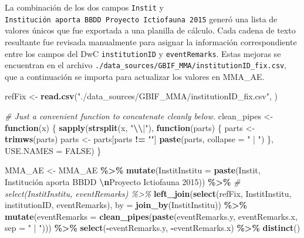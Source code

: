 \documentclass[sn-apa,pdflatex]{sn-jnl}
\newenvironment{Shaded}{\begin{snugshade}}{\end{snugshade}}
\newcommand{\AttributeTok}[1]{\textcolor[rgb]{0.13,0.29,0.53}{#1}}
\newcommand{\CommentTok}[1]{\textcolor[rgb]{0.56,0.35,0.01}{\textit{#1}}}
\newcommand{\ConstantTok}[1]{\textcolor[rgb]{0.56,0.35,0.01}{#1}}
\newcommand{\ControlFlowTok}[1]{\textcolor[rgb]{0.13,0.29,0.53}{\textbf{#1}}}
\newcommand{\FunctionTok}[1]{\textcolor[rgb]{0.13,0.29,0.53}{\textbf{#1}}}
\newcommand{\NormalTok}[1]{#1}
\newcommand{\OtherTok}[1]{\textcolor[rgb]{0.56,0.35,0.01}{#1}}
\newcommand{\SpecialCharTok}[1]{\textcolor[rgb]{0.81,0.36,0.00}{\textbf{#1}}}
\newcommand{\StringTok}[1]{\textcolor[rgb]{0.31,0.60,0.02}{#1}}
\begin{document}
La combinación de los dos campos \texttt{Instit} y
\texttt{Institución\ aporta\ BBDD\ Proyecto\ Ictiofauna\ 2015} generó
una lista de valores únicos que fue exportada a una planilla de cálculo.
Cada cadena de texto resultante fue revisada manualmente para asignar la
información correspondiente entre los campos del DwC
\texttt{institutionID} y \texttt{eventRemarks}. Estas mejoras se
encuentran en el archivo
\texttt{./data\_sources/GBIF\_MMA/institutionID\_fix.csv}, que a
continuación se importa para actualizar los valores en MMA\_AE.

\begin{Shaded}
\begin{Highlighting}[]
\NormalTok{refFix }\OtherTok{\textless{}{-}} \FunctionTok{read.csv}\NormalTok{(}\StringTok{"./data\_sources/GBIF\_MMA/institutionID\_fix.csv"}\NormalTok{,}
\NormalTok{    )}

\CommentTok{\# Just a convenient function to concatenate cleanly below.}
\NormalTok{clean\_pipes }\OtherTok{\textless{}{-}} \ControlFlowTok{function}\NormalTok{(x) \{}
    \FunctionTok{sapply}\NormalTok{(}\FunctionTok{strsplit}\NormalTok{(x, }\StringTok{"}\SpecialCharTok{\textbackslash{}\textbackslash{}}\StringTok{|"}\NormalTok{), }\ControlFlowTok{function}\NormalTok{(parts) \{}
\NormalTok{        parts }\OtherTok{\textless{}{-}} \FunctionTok{trimws}\NormalTok{(parts)}
\NormalTok{        parts }\OtherTok{\textless{}{-}}\NormalTok{ parts[parts }\SpecialCharTok{!=} \StringTok{""}\NormalTok{]}
        \FunctionTok{paste}\NormalTok{(parts, }\AttributeTok{collapse =} \StringTok{" | "}\NormalTok{)}
\NormalTok{    \}, }\AttributeTok{USE.NAMES =} \ConstantTok{FALSE}\NormalTok{)}
\NormalTok{\}}

\NormalTok{MMA\_AE }\OtherTok{\textless{}{-}}\NormalTok{ MMA\_AE }\SpecialCharTok{\%\textgreater{}\%}
    \FunctionTok{mutate}\NormalTok{(}\AttributeTok{InstitInstitu =} \FunctionTok{paste}\NormalTok{(Instit, }\StringTok{\textasciigrave{}}\AttributeTok{Institución aporta BBDD }\SpecialCharTok{\textbackslash{}n}\AttributeTok{Proyecto Ictiofauna 2015}\StringTok{\textasciigrave{}}\NormalTok{)) }\SpecialCharTok{\%\textgreater{}\%}
    \CommentTok{\# select(InstitInstitu, eventRemarks) \%\textgreater{}\%}
\FunctionTok{left\_join}\NormalTok{(}\FunctionTok{select}\NormalTok{(refFix, InstitInstitu, institutionID, eventRemarks),}
    \AttributeTok{by =} \FunctionTok{join\_by}\NormalTok{(InstitInstitu)) }\SpecialCharTok{\%\textgreater{}\%}
    \FunctionTok{mutate}\NormalTok{(}\AttributeTok{eventRemarks =} \FunctionTok{clean\_pipes}\NormalTok{(}\FunctionTok{paste}\NormalTok{(eventRemarks.y, eventRemarks.x,}
        \AttributeTok{sep =} \StringTok{" | "}\NormalTok{))) }\SpecialCharTok{\%\textgreater{}\%}
    \FunctionTok{select}\NormalTok{(}\SpecialCharTok{{-}}\NormalTok{eventRemarks.y, }\SpecialCharTok{{-}}\NormalTok{eventRemarks.x) }\SpecialCharTok{\%\textgreater{}\%}
    \FunctionTok{distinct}\NormalTok{()}
\end{Highlighting}
\end{Shaded}
\end{document}
